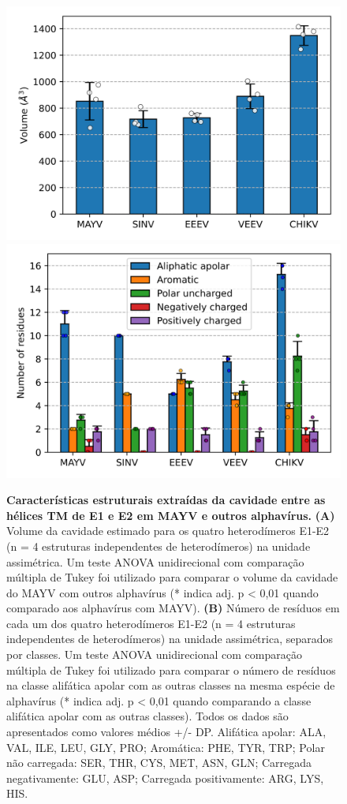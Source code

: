 \documentclass[Portugues]{phdquali}
\begin{document}
\begin{figure}[ht]
  \centering
    \includegraphics[scale=0.5]{images/mayv-e1-e2-volume.png}
    \includegraphics[scale=0.5]{images/mayv-e1-e2-res-dist.png}
  \caption[Características estruturais extraídas da cavidade entre as hélices TM de E1 e E2 em MAYV e outros alphavírus]{\textbf{Características estruturais extraídas da cavidade entre as hélices TM de E1 e E2 em MAYV e outros alphavírus.} \textbf{(A)} Volume da cavidade estimado para os quatro heterodímeros E1-E2 (n = 4 estruturas independentes de heterodímeros) na unidade assimétrica. Um teste ANOVA unidirecional com comparação múltipla de Tukey foi utilizado para comparar o volume da cavidade do MAYV com outros alphavírus (* indica adj. p < 0,01 quando comparado aos alphavírus com MAYV). \textbf{(B)} Número de resíduos em cada um dos quatro heterodímeros E1-E2 (n = 4 estruturas independentes de heterodímeros) na unidade assimétrica, separados por classes. Um teste ANOVA unidirecional com comparação múltipla de Tukey foi utilizado para comparar o número de resíduos na classe alifática apolar com as outras classes na mesma espécie de alphavírus (* indica adj. p < 0,01 quando comparando a classe alifática apolar com as outras classes). Todos os dados são apresentados como valores médios +/- DP. Alifática apolar: ALA, VAL, ILE, LEU, GLY, PRO; Aromática: PHE, TYR, TRP; Polar não carregada: SER, THR, CYS, MET, ASN, GLN; Carregada negativamente: GLU, ASP; Carregada positivamente: ARG, LYS, HIS.}
  \label{fig:mayv-e1-e2-plots}
\end{figure}
\end{document}
